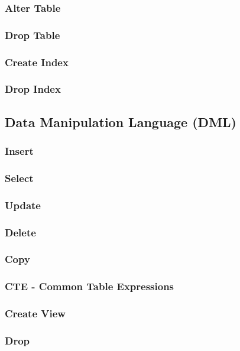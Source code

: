 \begin{multicols}{2}
        \subsubsection{Alter Table}
            
        \subsubsection{Drop Table}
            
        \subsubsection{Create Index}
            
        \subsubsection{Drop Index}
            
    \subsection{Data Manipulation Language (DML)}
        \subsubsection{Insert}
            
        \subsubsection{Select}
            
        \subsubsection{Update}
            
        \subsubsection{Delete}
            
        \subsubsection{Copy}
            
        \subsubsection{CTE - Common Table Expressions}
            
        \subsubsection{Create View}
            
        \subsubsection{Drop}
            
    \end{multicols}